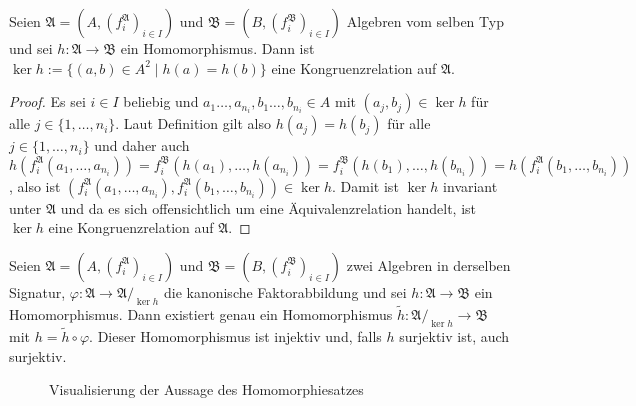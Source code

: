 \begin{lemma}
    Seien $\mathfrak{A}=(A,(f^\mathfrak{A}_i)_{i\in I})$ und $\mathfrak{B}=(B,(f^\mathfrak{B}_i)_{i\in I})$ Algebren vom selben Typ
    und sei $h:\mathfrak{A}\to \mathfrak{B}$ ein Homomorphismus. Dann ist $\ker h:=\{(a,b)\in A^2\mid h(a)=h(b)\}$ eine Kongruenzrelation auf $\mathfrak{A}$.
\end{lemma}

\begin{proof}
    Es sei $i\in I$ beliebig und $a_1\ldots,a_{n_i},b_1\ldots,b_{n_i}\in A$ mit $(a_j,b_j)\in \ker h$ für alle $j\in \{1,\ldots,n_i\}$.
    Laut Definition gilt also $h(a_j)=h(b_j)$ für alle $j\in\{1,\ldots,n_i\}$ und daher auch
    $h(f^\mathfrak{A}_i(a_1,\ldots,a_{n_i}))=f^\mathfrak{B}_i(h(a_1),\ldots,h(a_{n_i}))=f^\mathfrak{B}_i(h(b_1),\ldots,h(b_{n_i}))=h(f^\mathfrak{A}_i(b_1,\ldots,b_{n_i}))$,
    also ist $(f^\mathfrak{A}_i(a_1,\ldots,a_{n_i}),f^\mathfrak{A}_i(b_1,\ldots,b_{n_i}))\in\ker h$. Damit ist $\ker h$ invariant unter $\mathfrak{A}$
    und da es sich offensichtlich um eine Äquivalenzrelation handelt, ist $\ker h$ eine Kongruenzrelation auf $\mathfrak{A}$.
\end{proof}

\begin{theorem}[Homomorphiesatz]
    Seien $\mathfrak{A}=(A,(f^\mathfrak{A}_i)_{i\in I})$ und $\mathfrak{B}=(B,(f^\mathfrak{B}_i)_{i\in I})$ zwei Algebren
    in derselben Signatur, $\varphi:\mathfrak{A}\to \mathfrak{A}/_{\ker h}$ die kanonische Faktorabbildung und sei $h:\mathfrak{A}\to \mathfrak{B}$ ein Homomorphismus.
    Dann existiert genau ein Homomorphismus $\tilde{h}:\mathfrak{A}/_{\ker h}\to \mathfrak{B}$ mit $h=\tilde{h}\circ \varphi$. Dieser Homomorphismus
    ist injektiv und, falls $h$ surjektiv ist, auch surjektiv.
    \begin{figure}[H]
        \centering
        \caption{Visualisierung der Aussage des Homomorphiesatzes}
    \end{figure}
\end{theorem}

